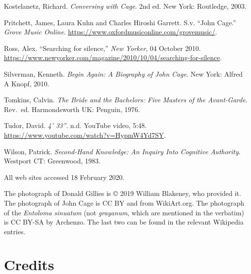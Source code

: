 \begin{mybiblist}
\item Kostelanetz, Richard.  \textit{Conversing with Cage}.  2nd ed.  New York: Routledge, 2003.


\item Pritchett, James, Laura Kuhn and Charles Hiroshi Garrett.  S.v. ``John Cage.''  \textit{Grove Music Online}. \url{https://www.oxfordmusiconline.com/grovemusic/}.

\item Ross, Alex.  ``Searching for silence,'' \textit{New Yorker}, 04 October 2010.  \url{https://www.newyorker.com/magazine/2010/10/04/searching-for-silence}.

\item Silverman, Kenneth. \textit{Begin Again: A Biography of John Cage}. New York: Alfred A Knopf, 2010.

\item Tomkins, Calvin.  \textit{The Bride and the Bachelors: Five Masters of the Avant-Garde}.  Rev.\ ed.  Harmondsworth UK: Penguin, 1976.

\item Tudor, David. \textit{4' 33''}.  n.d.  YouTube video, 5:48.  \url{https://www.youtube.com/watch?v=HypmW4Yd7SY}.

\item Wilson, Patrick.  \textit{Second-Hand Knowledge: An Inquiry Into Cognitive Authority}.  Westport CT: Greenwood, 1983.

\end{mybiblist}

All web sites accessed 18 February 2020.

The photograph of Donald Gillies is © 2019 William Blakeney, who provided it.  The photograph of John Cage is CC BY and from WikiArt.org.  The photograph of the \textit{Entoloma sinuatum} (not \textit{grayanum}, which are mentioned in the verbatim) is CC BY-SA by Archenzo.  The last two can be found in the relevant Wikipedia entries.


\newpageforperformers{}

\section{Credits}

